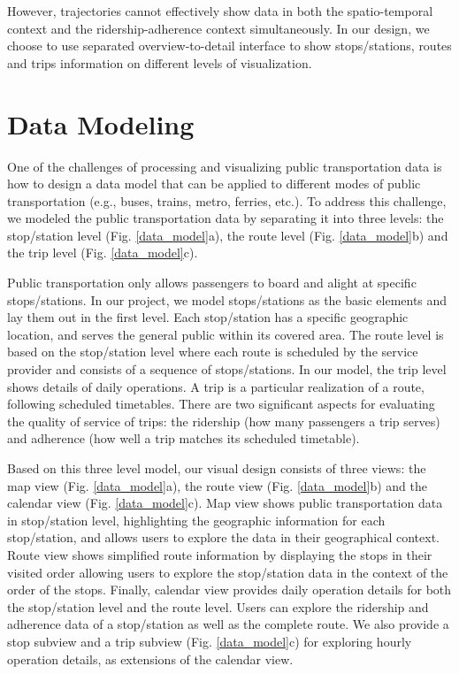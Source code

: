 \documentclass[journal]{vgtc}
\begin{document}
However, trajectories cannot effectively show data in both the spatio-temporal context and the ridership-adherence context simultaneously. In our design, we choose to use separated overview-to-detail interface to show stops/stations, routes and trips information on different levels of visualization.

\section{Data Modeling}


One of the challenges of processing and visualizing public transportation data is how to design a data model that can be applied to different modes of public transportation (e.g., buses, trains, metro, ferries, etc.).
To address this challenge, we modeled the public transportation data by separating it into three levels: the stop/station level (Fig. \ref{data_model}a), the route level (Fig. \ref{data_model}b) and the trip level (Fig. \ref{data_model}c).

Public transportation only allows passengers to board and alight at specific stops/stations. In our project, we model stops/stations as the basic elements and lay them out in the first level. Each stop/station has a specific geographic location, and serves the general public within its covered area.
The route level is based on the stop/station level where each route is scheduled by the service provider and consists of a sequence of stops/stations.
In our model, the trip level shows details of daily operations. A trip is a particular realization of a route, following scheduled timetables. There are two significant aspects for evaluating the quality of service of trips: the ridership (how many passengers a trip serves) and adherence (how well a trip matches its scheduled timetable).

Based on this three level model, our visual design consists of three views: the map view (Fig. \ref{data_model}a), the route view (Fig. \ref{data_model}b) and the calendar view (Fig. \ref{data_model}c). Map view shows public transportation data in stop/station level, highlighting the geographic information for each stop/station, and allows users to explore the data in their geographical context.
Route view shows simplified route information by displaying the stops in their visited order allowing users to explore the stop/station data in the context of the order of the stops.
Finally, calendar view provides daily operation details for both the stop/station level and the route level. Users can explore the ridership and adherence data of a stop/station as well as the complete route. We also provide a stop subview and a trip subview (Fig. \ref{data_model}c) for exploring hourly operation details, as extensions of the calendar view.
\end{document}
